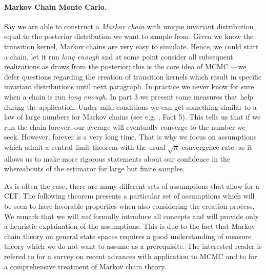 \paragraph{Markov Chain Monte Carlo.}
Say we are able to construct a \emph{Markov chain} with unique invariant distribution equal to the posterior distribution we want to sample from.
Given we know the transition kernel, Markov chains are very easy to simulate.
Hence, we could start a chain, let it run \emph{long enough} and at some point consider all subsequent realizations as draws from the posterior; this is the core idea of MCMC ---we defer questions regarding the creation of transition kernels which result in specific invariant distributions until next paragraph.
In practice we never know for sure when a chain is run \emph{long enough}.
In part 3 we present some measures that help during the application.
Under mild conditions we can get something similar to a law of large numbers for Markov chains (see e.g. \citet{roberts2004}, Fact 5).
This tells us that if we run the chain forever, our average will eventually converge to the number we seek.
However, forever is a very long time.
That is why we focus on assumptions which admit a central limit theorem with the usual $\sqrt{n}$ convergence rate, as it allows us to make more rigorous statements about our confidence in the whereabouts of the estimator for large but finite samples.

\begin{remark}
  As is often the case, there are many different sets of assumptions that allow for a CLT.
  The following theorem presents a particular set of assumptions which will be seen to have favorable properties when also considering the creation process.
  We remark that we will \emph{not} formally introduce all concepts and will provide only a heuristic explaination of the assumptions.
  This is due to the fact that Markov chain theory on general state spaces requires a good understanding of measure theory which we do not want to assume as a prerequisite.
  The interested reader is refered to \citet{roberts2004} for a survey on recent advances with application to MCMC and to \citet{meynandtweedie09} for a comprehensive treatment of Markov chain theory.
\end{remark}

